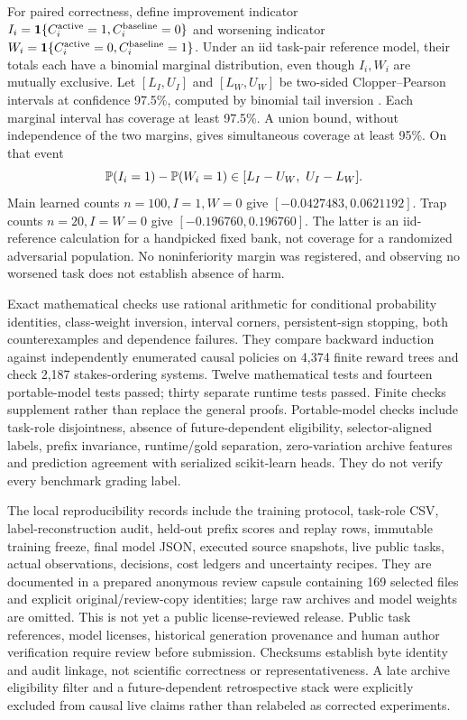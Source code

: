 For paired correctness, define improvement indicator
\(I_i=\mathbf 1\{C_i^{\mathrm{active}}=1,C_i^{\mathrm{baseline}}=0\}\)
and worsening indicator
\(W_i=\mathbf 1\{C_i^{\mathrm{active}}=0,C_i^{\mathrm{baseline}}=1\}\).
Under an iid task-pair reference model, their totals each have a binomial
marginal distribution, even though \(I_i,W_i\) are mutually exclusive.
Let \([L_I,U_I]\) and \([L_W,U_W]\) be two-sided Clopper--Pearson
intervals at confidence 97.5\%, computed by binomial tail inversion
\citep{clopper1934}. Each marginal interval has coverage at least 97.5\%.
A union bound, without independence of the two margins, gives simultaneous
coverage at least 95\%. On that event
\[
 \mathbb P(I_i=1)-\mathbb P(W_i=1)
 \in[L_I-U_W,\ U_I-L_W].
\]
Main learned counts \(n=100,I=1,W=0\) give
\([-0.0427483,0.0621192]\). Trap counts \(n=20,I=W=0\) give
\([-0.196760,0.196760]\). The latter is an iid-reference calculation for a
handpicked fixed bank, not coverage for a randomized adversarial population.
No noninferiority margin was registered, and observing no worsened task
does not establish absence of harm.

Exact mathematical checks use rational arithmetic for conditional probability
identities, class-weight inversion, interval corners, persistent-sign stopping,
both counterexamples and dependence failures. They compare backward induction
against independently enumerated causal policies on 4,374 finite reward trees
and check 2,187 stakes-ordering systems. Twelve mathematical tests and
fourteen portable-model tests passed; thirty separate runtime tests passed.
Finite checks supplement rather than replace the general proofs.
Portable-model checks include task-role disjointness, absence of future-dependent
eligibility, selector-aligned labels, prefix invariance, runtime/gold separation,
zero-variation archive features and prediction agreement with serialized
scikit-learn heads. They do not verify every benchmark grading label.

The local reproducibility records include the training protocol, task-role CSV,
label-reconstruction audit, held-out prefix scores and replay rows, immutable
training freeze, final model JSON, executed source snapshots, live public tasks,
actual observations, decisions, cost ledgers and uncertainty recipes.
They are documented in a prepared anonymous review capsule containing 169
selected files and explicit original/review-copy identities; large raw archives
and model weights are omitted. This is not yet a public license-reviewed
release. Public task references, model licenses,
historical generation provenance and human author verification require review
before submission. Checksums establish byte identity and audit linkage, not
scientific correctness or representativeness. A late archive eligibility filter
and a future-dependent retrospective stack were explicitly excluded from
causal live claims rather than relabeled as corrected experiments.
